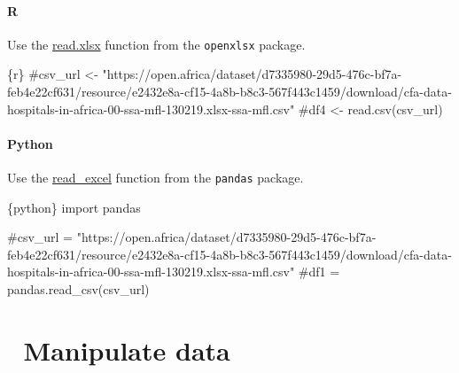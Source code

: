 \documentclass[
  letterpaper,
  DIV=11,
  numbers=noendperiod,
  oneside]{scrreprt}
\newenvironment{Shaded}{\begin{snugshade}}{\end{snugshade}}
\newcommand{\CommentTok}[1]{\textcolor[rgb]{0.37,0.37,0.37}{#1}}
\newcommand{\ImportTok}[1]{\textcolor[rgb]{0.00,0.46,0.62}{#1}}
\newcommand{\InformationTok}[1]{\textcolor[rgb]{0.37,0.37,0.37}{#1}}
\newcommand{\NormalTok}[1]{\textcolor[rgb]{0.00,0.23,0.31}{#1}}
\begin{document}
\subsubsection{R}

Use the
\href{https://www.rdocumentation.org/packages/openxlsx/versions/4.2.5/topics/read.xlsx}{read.xlsx}
function from the \texttt{openxlsx} package.

\begin{Shaded}
\begin{Highlighting}[]
\InformationTok{\textasciigrave{}\textasciigrave{}\textasciigrave{}\{r\}}
\CommentTok{\#csv\_url \textless{}{-} "https://open.africa/dataset/d7335980{-}29d5{-}476c{-}bf7a{-}feb4e22cf631/resource/e2432e8a{-}cf15{-}4a8b{-}b8c3{-}567f443c1459/download/cfa{-}data{-}hospitals{-}in{-}africa{-}00{-}ssa{-}mfl{-}130219.xlsx{-}ssa{-}mfl.csv"}
\CommentTok{\#df4 \textless{}{-} read.csv(csv\_url)}
\InformationTok{\textasciigrave{}\textasciigrave{}\textasciigrave{}}
\end{Highlighting}
\end{Shaded}

\subsubsection{Python}

Use the
\href{https://pandas.pydata.org/docs/reference/api/pandas.read_excel.html}{read\_excel}
function from the \texttt{pandas} package.

\begin{Shaded}
\begin{Highlighting}[]
\InformationTok{\textasciigrave{}\textasciigrave{}\textasciigrave{}\{python\}}
\ImportTok{import}\NormalTok{ pandas}

\CommentTok{\#csv\_url = "https://open.africa/dataset/d7335980{-}29d5{-}476c{-}bf7a{-}feb4e22cf631/resource/e2432e8a{-}cf15{-}4a8b{-}b8c3{-}567f443c1459/download/cfa{-}data{-}hospitals{-}in{-}africa{-}00{-}ssa{-}mfl{-}130219.xlsx{-}ssa{-}mfl.csv"}
\CommentTok{\#df1 = pandas.read\_csv(csv\_url)}
\InformationTok{\textasciigrave{}\textasciigrave{}\textasciigrave{}}
\end{Highlighting}
\end{Shaded}

\hypertarget{manipulate-data}{%
\chapter{\texorpdfstring{{📘} Manipulate
data}{📘 Manipulate data}}\label{manipulate-data}}
\end{document}

